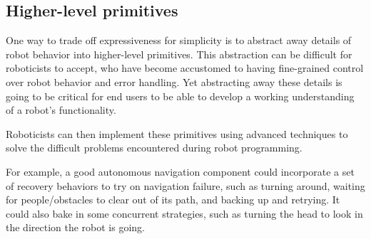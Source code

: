 \documentclass[10pt,twocolumn]{article}
\begin{document}


\begin{changebar}
\subsection{Higher-level primitives}

One way to trade off expressiveness for simplicity is to abstract away details of robot behavior into higher-level primitives. This abstraction can be difficult for roboticists to accept, who have become accustomed to having fine-grained control over robot behavior and error handling. Yet abstracting away these details is going to be critical for end users to be able to develop a working understanding of a robot's functionality.


Roboticists can then implement these primitives using advanced techniques to solve the difficult problems encountered during robot programming.
\end{changebar}
For example, a good autonomous navigation component could incorporate a set of recovery behaviors to try on navigation failure, such as turning around, waiting for people/obstacles to clear out of its path, and backing up and retrying. It could also bake in some concurrent strategies, such as turning the head to look in the direction the robot is going. 
\end{document}

